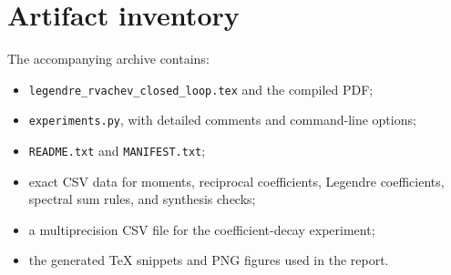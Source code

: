\documentclass[11pt,oneside]{article}
\numberwithin{equation}{section}
\theoremstyle{definition}
\theoremstyle{remark}
\begin{document}
\section{Artifact inventory}
\label{app:inventory}

The accompanying archive contains:
\begin{itemize}
  \item \texttt{legendre\_rvachev\_closed\_loop.tex} and the compiled PDF;
  \item \texttt{experiments.py}, with detailed comments and command-line
  options;
  \item \texttt{README.txt} and \texttt{MANIFEST.txt};
  \item exact CSV data for moments, reciprocal coefficients, Legendre
  coefficients, spectral sum rules, and synthesis checks;
  \item a multiprecision CSV file for the coefficient-decay experiment;
  \item the generated TeX snippets and PNG figures used in the report.
\end{itemize}
\end{document}
